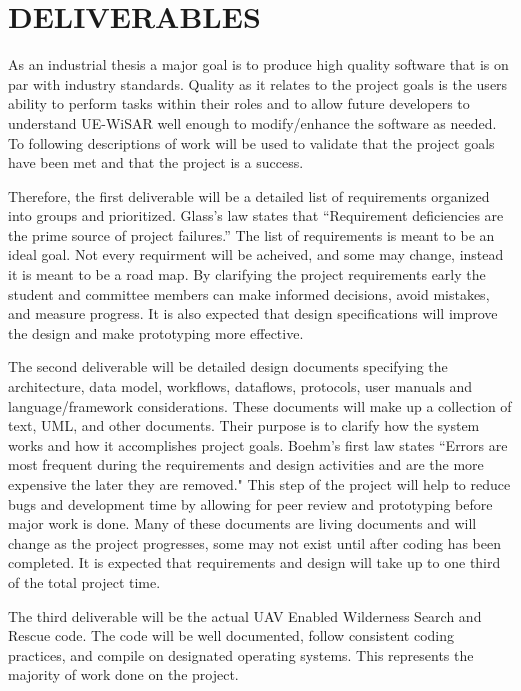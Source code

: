 \documentclass[12pt]{IEEEtran}
\begin{document}
\section{DELIVERABLES}
As an industrial thesis a major goal is to produce high quality software that is
on par with industry standards.  Quality as it relates to the project goals is
the users ability to perform tasks within their roles and to allow future
developers to understand UE-WiSAR well enough to modify/enhance the software as
needed.  To following descriptions of work will be used to validate that the
project goals have been met and that the project is a success.

Therefore, the first deliverable will be a detailed list of requirements
organized into groups and prioritized.  Glass's law
\cite[p.~16]{endres2003handbook} states that ``Requirement deficiencies are the
prime source of project failures.''  The list of requirements is meant to be an ideal goal.
Not every requirment will be acheived, and some may change, instead it is meant
to be a road map.  By clarifying the project requirements early the student and
committee members can make informed decisions, avoid mistakes, and measure progress.
It is also expected that design specifications will improve the design and make
prototyping more effective.  

The second deliverable will be detailed design documents specifying the
architecture, data model, workflows, dataflows, protocols, user manuals and
language/framework considerations.  These documents will make up a collection
of text, UML, and other documents.  Their purpose is to clarify how the system
works and how it accomplishes project goals.  Boehm's first law
\cite[p.~17]{endres2003handbook} states ``Errors are most frequent during the requirements and design activities and are the
more expensive the later they are removed."  This step of the project will help
to reduce bugs and development time by allowing for peer review and prototyping
before major work is done.  Many of these documents are living documents and
will change as the project progresses, some may not exist until after coding
has been completed.  It is expected that requirements and design will take up to
one third of the total project time.

The third deliverable will be the actual UAV Enabled Wilderness Search and
Rescue code.  The code will be well documented, follow consistent coding
practices, and compile on designated operating systems.  This represents the
majority of work done on the project.
\end{document}
